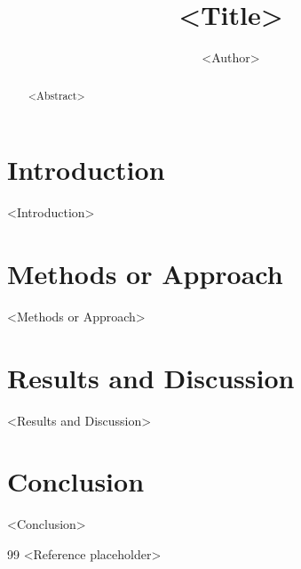 \documentclass[11pt]{article}
\title{<Title>}
\author{<Author>}
\date{}
\begin{document}
\maketitle

\begin{abstract}
<Abstract>
\end{abstract}

\section{Introduction}
<Introduction>

\section{Methods or Approach}
<Methods or Approach>

\section{Results and Discussion}
<Results and Discussion>

\section{Conclusion}
<Conclusion>

\begin{thebibliography}{99}
 <Reference placeholder>
\end{thebibliography}
\end{document}
